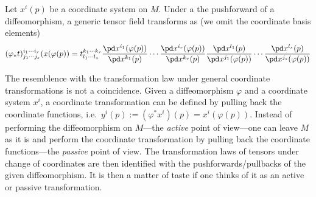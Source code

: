 \documentclass[10pt,reqno]{amsart}
\numberwithin{equation}{section}
\begin{document}
Let $x^i(p)$ be a coordinate system on $M$. Under a the 
pushforward of a diffeomorphism, a generic tensor field 
transforms as (we omit the coordinate basis elements)
%
\begin{equation}
	(\varphi_\ast t)^{i_1\cdots i_r}_{j_1\cdots j_s}(x(\varphi(p))
	= t^{k_1\cdots k_r}_{l_1\cdots l_s} \frac{\pd 
		x^{i_1}(\varphi(p))}{\pd x^{k_1}(p)} \cdots \frac{\pd 
		x^{i_r}(\varphi(p))}{\pd x^{k_r}(p)} \frac{\pd 
		x^{l_1}(p)}{\pd x^{j_1}(\varphi(p))} \cdots \frac{\pd 
		x^{l_s}(p)}{\pd x^{j_s}(\varphi(p))}
\end{equation}

The resemblence with the transformation law under general 
coordinate transformations is not a coincidence. Given a 
diffeomorphism $\varphi$ and a coordinate system $x^i$, a 
coordinate transformation can be defined by pulling back the 
coordinate functions, i.e.\ $y^i(p) := (\varphi^\ast x^i)(p) = 
x^i(\varphi(p))$. Instead of performing the diffeomorphism on 
$M$---the \emph{active} point of view---one can leave $M$ as it 
is and perform the coordinate transformation by pulling back the 
coordinate functions---the \emph{passive} point of view. The 
transformation laws of tensors under change of coordinates are 
then identified with the pushforwards/pullbacks of the given 
diffeomorphism. It is then a matter of taste if one thinks of it 
as an active or passive transformation.
\end{document}
